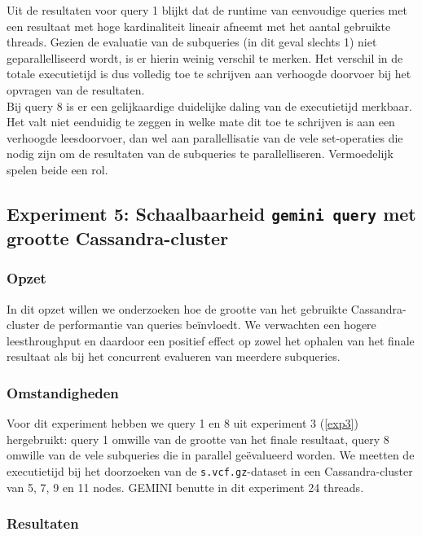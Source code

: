 Uit de resultaten voor query 1 blijkt dat de runtime van eenvoudige queries met een resultaat met hoge kardinaliteit lineair afneemt met het aantal gebruikte threads. Gezien de evaluatie van de subqueries (in dit geval slechts 1) niet geparallelliseerd wordt, is er hierin weinig verschil te merken. Het verschil in de totale executietijd is dus volledig toe te schrijven aan verhoogde doorvoer bij het opvragen van de resultaten.\\
Bij query 8 is er een gelijkaardige duidelijke daling van de executietijd merkbaar. Het valt niet eenduidig te zeggen in welke mate dit toe te schrijven is aan een verhoogde leesdoorvoer, dan wel aan parallellisatie van de vele set-operaties die nodig zijn om de resultaten van de subqueries te parallelliseren. Vermoedelijk spelen beide een rol.

\subsection{Experiment 5: Schaalbaarheid \texttt{gemini query} met grootte Cassandra-cluster}
\label{exp5}

\subsubsection{Opzet}

In dit opzet willen we onderzoeken hoe de grootte van het gebruikte Cassandra-cluster de performantie van queries be\"invloedt. We verwachten een hogere leesthroughput en daardoor een positief effect op zowel het ophalen van het finale resultaat als bij het concurrent evalueren van meerdere subqueries.

\subsubsection{Omstandigheden}

Voor dit experiment hebben we query 1 en 8 uit experiment 3 (\ref{exp3}) hergebruikt: query 1 omwille van de grootte van het finale resultaat, query 8 omwille van de vele subqueries die in parallel ge\"evalueerd worden. We meetten de executietijd bij het doorzoeken van de \texttt{s.vcf.gz}-dataset in een Cassandra-cluster van 5, 7, 9 en 11 nodes. GEMINI benutte in dit experiment 24 threads.

\subsubsection{Resultaten}


